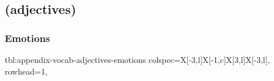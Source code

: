 \documentclass[../nihongo-gakushuu-kyouzai.tex]{subfiles}
\begin{document}
\appendix
\setcounter{section}{2}
\setcounter{subsection}{2}

\subsection{ (adjectives)}

\subsubsection{Emotions}
{tbl:appendix-vocab-adjectives-emotions}  %
{}  %
{
    colspec={X[-3,l]X[-1,c]X[3,l]X[-3,l]},
    rowhead=1,
}  %
\end{document}
